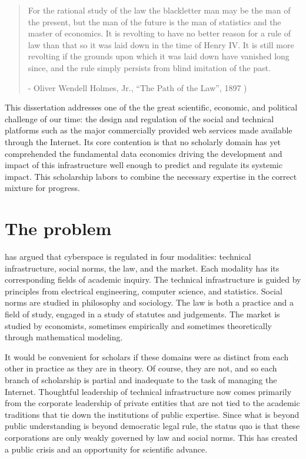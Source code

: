 \documentclass[../thesis.tex]{subfiles}
\begin{document}
 \begin{quote}
   For the rational study of the law the blackletter man may be the man of the present, but the man of the future is the man of statistics and the master of economics. It is revolting to have no better reason for a rule of law than that so it was laid down in the time of Henry IV. It is still more revolting if the grounds upon which it was laid down have vanished long since, and the rule simply persists from blind imitation of the past.

   - Oliver Wendell Holmes, Jr., ``The Path of the Law'', 1897 \cite{holmes1897path})
 \end{quote}
 
 This dissertation addresses one of the the great
 scientific, economic,
 and political challenge of our time: the design and
 regulation of
 the social and technical platforms such as the major
 commercially
 provided web services made available through the Internet.
 Its core contention is that no scholarly domain has yet
 comprehended the
 fundamental data economics driving the development and
 impact of this
 infrastructure well enough to predict and regulate its
 systemic impact.
 This scholarship labors to combine the necessary expertise
 in the
 correct mixture for progress.

\section{The problem}
 
 \citet{lessig2009code} has argued that cyberspace is regulated
 in four modalities: technical infrastructure, social norms,
 the law, and the market.
 Each modality has its corresponding fields of academic inquiry.
 The technical infrastructure is guided by principles from
 electrical engineering, computer science, and statistics.
 Social norms are studied in philosophy and sociology.
 The law is both a practice and a field of study,
 engaged in a study of statutes and judgements.
 The market is studied by economists, sometimes empirically
 and sometimes theoretically through mathematical modeling.

 It would be convenient for scholars if these domains were
 as distinct from each other in practice as they are in
 theory.
 Of course, they are not, and so each branch of scholarship
 is partial and inadequate to the task of managing the Internet.
 Thoughtful leadership of technical infrastructure now comes
 primarily from the corporate leadership of private entities
 that are not tied to the academic traditions that tie down
 the institutions of public expertise.
 Since what is beyond public understanding is beyond democratic
 legal rule, the status quo is that these corporations are only
 weakly governed by law and social norms.
 This has created a public crisis and an opportunity for
 scientific advance.
 
\end{document}
